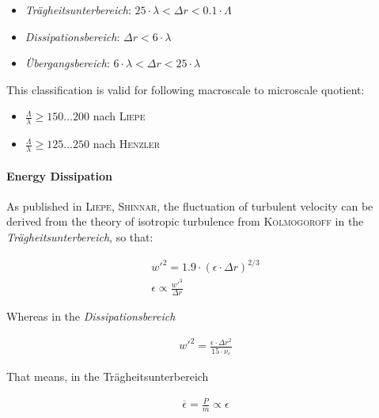 \begin{itemize}
	\item \textit{Tr\"agheitsunterbereich}: $25 \cdot \lambda < \Delta{r} < 0.1 \cdot \Lambda$
	\item \textit{Dissipationsbereich}: $\Delta{r} < 6 \cdot \lambda$
	\item \textit{\"Ubergangsbereich}: $6 \cdot \lambda < \Delta{r} < 25 \cdot \lambda$
\end{itemize}

This classification is valid for following macroscale to microscale quotient:

\begin{itemize}
	\item $\frac{\Lambda}{\lambda} \geqslant 150...200$ nach \textsc{Liepe}
	\item $\frac{\Lambda}{\lambda} \geqslant 125...250$ nach \textsc{Henzler}
\end{itemize}

\paragraph{Energy Dissipation}
As published in \textsc{Liepe, Shinnar}, the fluctuation of turbulent velocity can be derived from the theory of isotropic turbulence from \textsc{Kolmogoroff} in the \textit{Tr\"agheitsunterbereich}, so that:

\begin{align}
	{w'}^2 = 1.9 \cdot \left( \epsilon \cdot \Delta{r} \right)^{2/3} \\
	\epsilon \propto \frac{{w'}^3}{\Delta{r}}
\end{align}

Whereas in the \textit{Dissipationsbereich}

\begin{align}
	{w'}^2 = \frac{\epsilon \cdot \Delta{r}^2}{15 \cdot \nu_c}
\end{align}

That means, in the Tr\"agheitsunterbereich

\begin{align}
	\overline{\epsilon} = \frac{P}{m} \propto \epsilon
\end{align}